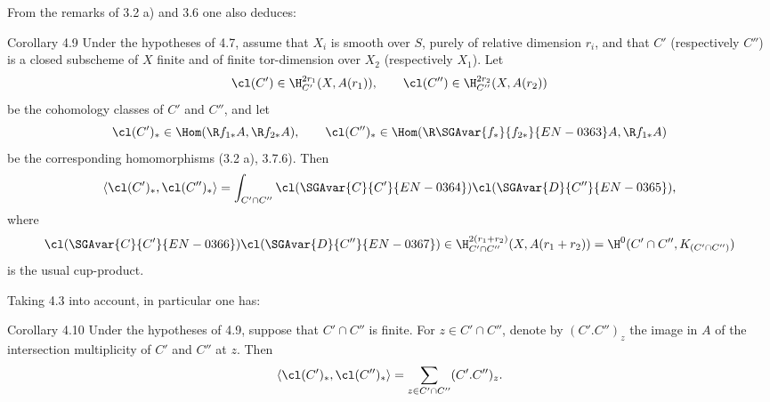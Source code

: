 From the remarks of 3.2 a) and 3.6 one also deduces:

\begin{statement}{Corollary 4.9}
Under the hypotheses of 4.7, assume that $X_i$ is smooth over $S$, purely of relative dimension $r_i$, and that $C'$ (respectively $C''$) is a closed subscheme of $X$ finite and of finite tor-dimension over $X_2$ (respectively $X_1$). Let
\[
\cl(C')\in \H_{C'}^{2r_1}(X,A(r_1)),\qquad
\cl(C'')\in \H_{C''}^{2r_2}(X,A(r_2))
\]
be the cohomology classes of $C'$ and $C''$, and let
\[
\cl(C')_*\in\Hom(\R f_{1*}A,\R f_{2*}A),\qquad
\cl(C'')_*\in\Hom(\R \SGAvar{f_{*}}{f_{2*}}{EN-0363}A,\R f_{1*}A)
\]
be the corresponding homomorphisms (3.2 a), 3.7.6). Then
\[
\langle \cl(C')_*,\cl(C'')_*\rangle
=
\int_{C'\cap C''}\cl(\SGAvar{C}{C'}{EN-0364})\cl(\SGAvar{D}{C''}{EN-0365}),
\]
where
\[
\cl(\SGAvar{C}{C'}{EN-0366})\cl(\SGAvar{D}{C''}{EN-0367})\in
\H_{C'\cap C''}^{2(r_1+r_2)}(X,A(r_1+r_2))
=
\H^0(C'\cap C'',K_{(C'\cap C'')})
\]
is the usual cup-product.
\end{statement}

Taking 4.3 into account, in particular one has:

\begin{statement}{Corollary 4.10}
Under the hypotheses of 4.9, suppose that $C'\cap C''$ is finite. For $z\in C'\cap C''$, denote by $(C'.C'')_z$ the image in $A$ of the intersection multiplicity of $C'$ and $C''$ at $z$. Then
\[
\langle \cl(C')_*,\cl(C'')_*\rangle
=
\sum_{z\in C'\cap C''}(C'.C'')_z.
\]
\end{statement}

